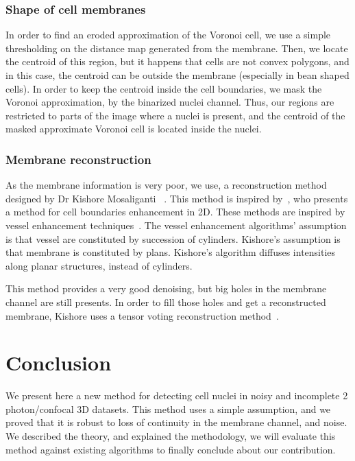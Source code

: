 \subsubsection{Shape of cell membranes}

In order to find an eroded approximation of the Voronoi cell, we use a simple thresholding on the distance map generated from the membrane.
Then, we locate the centroid of this region, but it happens that cells are not convex polygons, and in this case, the centroid can be outside the membrane (especially in bean shaped cells).
In order to keep the centroid inside the cell boundaries, we mask the Voronoi approximation, by the binarized nuclei channel.
Thus, our regions are restricted to parts of the image where a nuclei is present, and the centroid of the masked approximate Voronoi cell is located inside the nuclei.

\subsubsection{Membrane reconstruction}

As the membrane information is very poor, we use, a reconstruction method designed by Dr Kishore Mosaliganti {\etal}~\cite{kishoreMembrane}. This method is inspired by~\cite{tasdizen2005enhancement}, who presents a method for cell boundaries enhancement in 2D.
These methods are inspired by vessel enhancement techniques~\cite{frangi1998multiscale, manniesing2006vessel}.
The vessel enhancement algorithms' assumption is that vessel are constituted by succession of cylinders. Kishore's assumption is that membrane is constituted by plans.
Kishore's algorithm diffuses intensities along planar structures, instead of cylinders.

This method provides a very good denoising, but big holes in the membrane channel are still presents. In order to fill those holes and get a reconstructed membrane, Kishore uses a tensor voting reconstruction method~\cite{tensorvoting}.





\section*{Conclusion}

We present here a new method for detecting cell nuclei in noisy and incomplete 2 photon/confocal 3D datasets.
This method uses a simple assumption, and we proved that it is robust to loss of continuity in the membrane channel, and noise.
We described the theory, and explained the methodology, we will evaluate this method against existing algorithms to finally conclude about our contribution.



